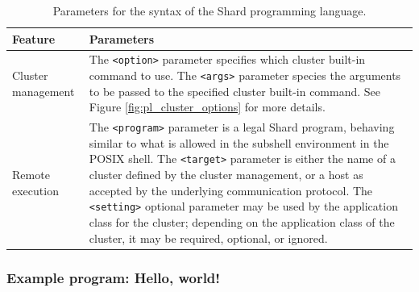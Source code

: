 \documentclass[oneside]{report}
\begin{document}
\begin{table}[h]
  \begin{center}
    \begin{tabularx}{\textwidth}{|l|X|}
      \hline
      Feature            & Parameters                                                                                                                                                                                                                                                                                                                                                                                                                                                                                                                       \\ \hline
      Cluster management & The \texttt{<option>} parameter specifies which cluster built-in command to use. \newline The \texttt{<args>} parameter species the arguments to be passed to the specified cluster built-in command. \newline See Figure \ref{fig:pl_cluster_options} for more details.                                                                                                                                                                                                                                                         \\ \hline
      Remote execution   & The \texttt{<program>} parameter is a legal Shard program, behaving similar to what is allowed in the subshell environment in the POSIX shell. \newline The \texttt{<target>} parameter is either the name of a cluster defined by the cluster management, or a host as accepted by the underlying communication protocol. \newline The \texttt{<setting>} optional parameter may be used by the application class for the cluster; depending on the application class of the cluster, it may be required, optional, or ignored. \\ \hline
    \end{tabularx}
    \caption{Parameters for the syntax of the Shard programming language.}
    \label{fig:pl_syntax_parameters}
  \end{center}
\end{table}

\subsubsection{Example program: Hello, world!}
\end{document}
